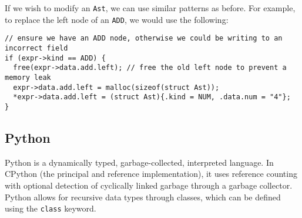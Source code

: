 \documentclass[12pt, letterpaper]{article}
\begin{document}
If we wish to modify an \texttt{Ast}, we can use similar patterns as before. For example, to replace the left node of an \texttt{ADD}, we would use the following:
\begin{verbatim}
// ensure we have an ADD node, otherwise we could be writing to an incorrect field
if (expr->kind == ADD) {
  free(expr->data.add.left); // free the old left node to prevent a memory leak
  expr->data.add.left = malloc(sizeof(struct Ast));
  *expr->data.add.left = (struct Ast){.kind = NUM, .data.num = "4"};
}
\end{verbatim}

\subsection{Python}
Python is a dynamically typed, garbage-collected, interpreted language. In CPython (the principal and reference implementation), it uses reference counting with optional detection of cyclically linked garbage through a garbage collector.\autocite{python-data-model} Python allows for recursive data types through classes, which can be defined using the \texttt{class} keyword.
\end{document}
